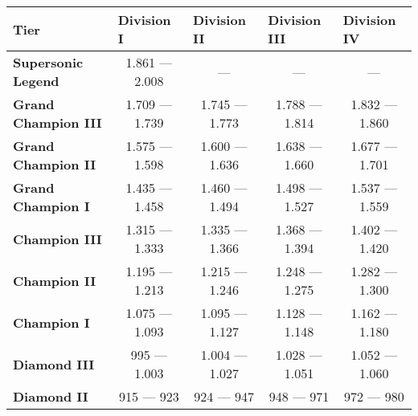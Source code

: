 \begin{table}[]
    \begin{tabular}{|l|c|c|c|c|}
    \hline
    \textbf{Tier}                 & \multicolumn{1}{l|}{\textbf{Division I}} & \multicolumn{1}{l|}{\textbf{Division II}} & \multicolumn{1}{l|}{\textbf{Division III}} & \multicolumn{1}{l|}{\textbf{Division IV}} \\ \hline
    \textbf{Supersonic   Legend}  & 1.861 — 2.008                            & —                                         & —                                          & —                                         \\ \hline
    \textbf{Grand Champion   III} & 1.709 — 1.739                            & 1.745 — 1.773                             & 1.788 — 1.814                              & 1.832 — 1.860                             \\ \hline
    \textbf{Grand Champion   II}  & 1.575 — 1.598                            & 1.600 — 1.636                             & 1.638 — 1.660                              & 1.677 — 1.701                             \\ \hline
    \textbf{Grand Champion I}     & 1.435 — 1.458                            & 1.460 — 1.494                             & 1.498 — 1.527                              & 1.537 — 1.559                             \\ \hline
    \textbf{Champion III}         & 1.315 — 1.333                            & 1.335 — 1.366                             & 1.368 — 1.394                              & 1.402 — 1.420                             \\ \hline
    \textbf{Champion II}          & 1.195 — 1.213                            & 1.215 — 1.246                             & 1.248 — 1.275                              & 1.282 — 1.300                             \\ \hline
    \textbf{Champion I}           & 1.075 — 1.093                            & 1.095 — 1.127                             & 1.128 — 1.148                              & 1.162 — 1.180                             \\ \hline
    \textbf{Diamond III}          & 995 — 1.003                              & 1.004 — 1.027                             & 1.028 — 1.051                              & 1.052 — 1.060                             \\ \hline
    \textbf{Diamond II}           & 915 — 923                                & 924 — 947                                 & 948 — 971                                  & 972 — 980                                 \\ \hline

\end{tabular}
\end{table}
